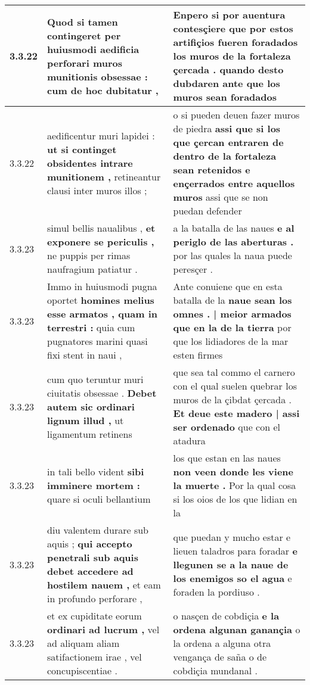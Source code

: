 \begin{tabular}{|p{1cm}|p{6.5cm}|p{6.5cm}|}
3.3.22 & Quod si tamen contingeret \textbf{ per huiusmodi aedificia perforari muros munitionis obsessae : } cum de hoc dubitatur , & Enpero si por auentura contesçiere \textbf{ que por estos artifiçios fueren foradados los muros de la fortaleza çercada . } quando desto dubdaren ante que los muros sean foradados \\\hline
3.3.22 & aedificentur muri lapidei : \textbf{ ut si continget obsidentes intrare munitionem , } retineantur clausi inter muros illos ; & o si pueden deuen fazer muros de piedra \textbf{ assi que si los que çercan entraren de dentro de la fortaleza sean retenidos e ençerrados entre aquellos muros } assi que se non puedan defender \\\hline
3.3.23 & simul bellis naualibus , \textbf{ et exponere se periculis , } ne puppis per rimas naufragium patiatur . & a la batalla de las naues \textbf{ e al periglo de las aberturas . } por las quales la naua puede peresçer . \\\hline
3.3.23 & Immo in huiusmodi pugna oportet \textbf{ homines melius esse armatos , quam in terrestri : } quia cum pugnatores marini quasi fixi stent in naui , & Ante conuiene que en esta batalla de la \textbf{ naue sean los omnes . | meior armados que en la de la tierra } por que los lidiadores de la mar esten firmes \\\hline
3.3.23 & cum quo teruntur muri ciuitatis obsessae . \textbf{ Debet autem sic ordinari lignum illud , } ut ligamentum retinens & que sea tal commo el carnero con el qual suelen quebrar los muros de la çibdat çercada . \textbf{ Et deue este madero | assi ser ordenado } que con el atadura \\\hline
3.3.23 & in tali bello vident \textbf{ sibi imminere mortem : } quare si oculi bellantium & los que estan en las naues \textbf{ non veen donde les viene la muerte . } Por la qual cosa si los oios de los que lidian en la \\\hline
3.3.23 & diu valentem durare sub aquis ; \textbf{ qui accepto penetrali sub aquis debet accedere ad hostilem nauem , } et eam in profundo perforare , & que puedan y mucho estar e lieuen taladros para foradar \textbf{ e llegunen se a la naue de los enemigos so el agua } e foraden la pordiuso . \\\hline
3.3.23 & et ex cupiditate eorum \textbf{ ordinari ad lucrum , } vel ad aliquam aliam satifactionem irae , vel concupiscentiae . & o nasçen de cobdiçia \textbf{ e la ordena algunan ganançia } o la ordena a alguna otra vengança de saña o de cobdiçia mundanal . \\\hline

\end{tabular}
